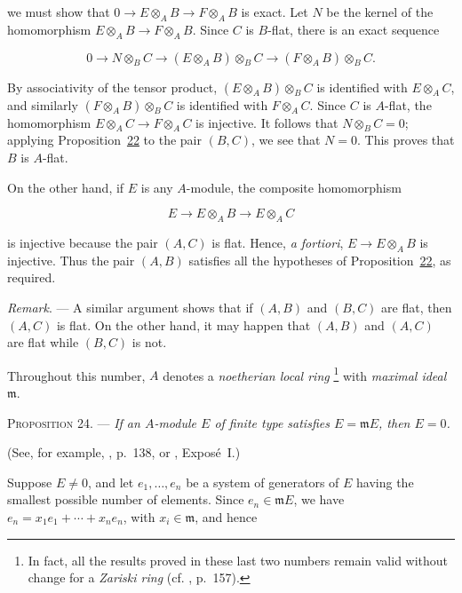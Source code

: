 we must show that
$0\to E\otimes_AB\to F\otimes_AB$ is exact. Let $N$ be the kernel of the
homomorphism $E\otimes_AB\to F\otimes_AB$. Since $C$ is $B$-flat, there is
an exact sequence

\begin{equation*}
0\longrightarrow N\otimes_BC\longrightarrow
(E\otimes_AB)\otimes_BC\longrightarrow(F\otimes_AB)\otimes_BC.
\end{equation*}

By associativity of the tensor product, $(E\otimes_AB)\otimes_BC$ is
identified with $E\otimes_AC$, and similarly $(F\otimes_AB)\otimes_BC$ is
identified with $F\otimes_AC$. Since $C$ is $A$-flat, the homomorphism
$E\otimes_AC\to F\otimes_AC$ is injective. It follows that $N\otimes_BC=0$;
applying Proposition~\hyperref[gaga:prop:22]{22} to the pair $(B,C)$, we see
that $N=0$. This proves that $B$ is $A$-flat.

On the other hand, if $E$ is any $A$-module, the composite homomorphism

\begin{equation*}
E\longrightarrow E\otimes_AB\longrightarrow E\otimes_AC
\end{equation*}

is injective because the pair $(A,C)$ is flat. Hence, \emph{a fortiori},
$E\to E\otimes_AB$ is injective. Thus the pair $(A,B)$ satisfies all the
hypotheses of Proposition~\hyperref[gaga:prop:22]{22}, as required.

\emph{Remark}. --- A similar argument shows
that if $(A,B)$ and $(B,C)$ are flat, then $(A,C)$ is flat. On the other hand,
it may happen that $(A,B)$ and $(A,C)$ are flat while $(B,C)$ is not.


Throughout this number, $A$ denotes a \emph{noetherian local ring}
\footnote{In fact, all the results proved in these last two numbers remain
valid without change for a \emph{Zariski ring} (cf. , p.~157).} with
\emph{maximal ideal} $\mathfrak{m}$.

\textsc{Proposition 24}. --- \emph{If an $A$-module
$E$ of finite type satisfies $E=\mathfrak{m}E$, then $E=0$.}

(See, for example, , p.~138, or , Exposé~I.)

Suppose $E\ne0$, and let $e_1,\ldots,e_n$ be a system of generators of $E$
having the smallest possible number of elements. Since
$e_n\in\mathfrak{m}E$, we have
$e_n=x_1e_1+\cdots+x_ne_n$, with $x_i\in\mathfrak{m}$, and hence


